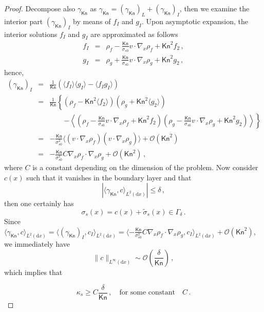 \documentclass[english,reqno]{amsart}
\theoremstyle{plain}
\theoremstyle{definition} %
\newcommand{\average}[1]{ \langle#1 \rangle}
\newcommand{\rd}{\mathrm{d}}
\newcommand{\Kn}{\mathsf{Kn}}
\begin{document}
\begin{proof}
Decompose also $\gamma_\Kn$ as $\gamma_\Kn = \left(\gamma_\Kn \right)_L + \left( \gamma_\Kn\right)_I$, then we examine the interior part $(\gamma_\Kn)_I$ by means of $f_I$ and $g_I$. Upon asymptotic expansion, the interior solutions $f_I$ and $g_I$ are approximated as follows
\begin{eqnarray*} 
f_I &=& \rho_f - \frac{\Kn}{\sigma_{s0}} v \cdot \nabla_x \rho_f + \Kn^2f_2 \,,
\\ g_I &=& \rho_g  + \frac{\Kn}{\sigma_{s0}} v \cdot \nabla_x \rho_g + \Kn^2g_2\,,
\end{eqnarray*}
hence, 
\begin{eqnarray} \label{eqn:0223}
(\gamma_\Kn)_I &=& \frac{1}{\Kn} ( \average{f_I} \average{g_I} - \average{f_I g_I}) \nonumber
\\ &=& \frac{1}{\Kn} \left\{  (\rho_f-\Kn^2 \average{f_2}) (\rho_g + \Kn^2 \average{g_2} )   \right.  \nonumber
\\ && \qquad  \left. - \left\langle    \left( \rho_f - \frac{\Kn}{\sigma_{s0}} v\cdot \nabla_x \rho_f + \Kn^2f_2\right) 
\left(\rho_g - \frac{\Kn}{\sigma_{s0}} v\cdot \nabla_x \rho_g + \Kn^2g_2 \right) \right\rangle   \right\} \nonumber
\\ &=& - \frac{\Kn}{\sigma_{s0}^2} \average{  (v\cdot \nabla_x \rho_f ) (v \cdot \nabla_x \rho_g)}  + \mathcal{O}(\Kn^2) \nonumber
\\ & = & - \frac{\Kn}{\sigma_{s0}^2}  C \nabla_x \rho_f \cdot \nabla_x \rho_g  + \mathcal{O}(\Kn^2)\,,
\end{eqnarray}
where $C$ is a constant depending on the dimension of the problem. Now consider $c(x)$ such that it vanishes in the boundary layer and that
\begin{equation*}
|\average{\gamma_\Kn, c}_{L^2(\rd{x})}| \leq \delta\,,
\end{equation*}
then one certainly has
\[
\sigma_s(x) = c(x) +\tilde{\sigma}_s(x)\in\Gamma_\delta\,.
\]
Since $\average{\gamma_\Kn, c}_{L^2(\rd{x})} = \average{(\gamma_\Kn)_I, c_I} _{L^2(\rd{x})} = \average{ - \frac{\Kn}{\sigma_{s0}^2}  C \nabla_x \rho_f \cdot \nabla_x \rho_g  , c_I}_{L^2(\rd{x})} + \mathcal{O}(\Kn^2)$, 
we immediately have
\begin{equation*}
\|c\|_{L^\infty(\rd{x})} \sim \mathcal{O}\left( \frac{\delta }{\Kn} \right)\,,
\end{equation*}
which implies that

\[
\kappa_s \geq  C\frac{\delta }{\Kn} \,,\quad \text{for some constant}\quad C\,.
\]

\end{proof}
\end{document}

